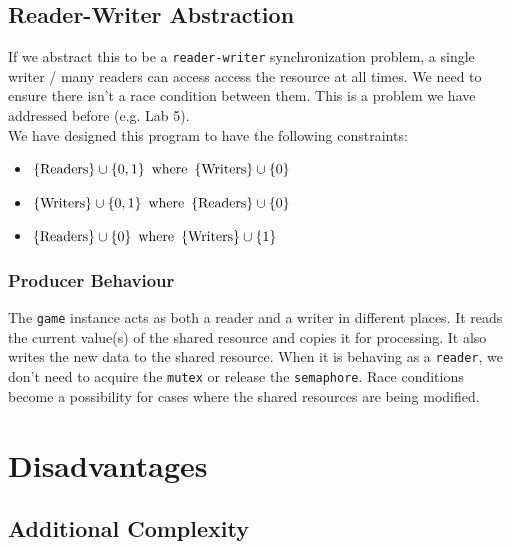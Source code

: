 \documentclass{article}
\begin{document}
\subsection{Reader-Writer Abstraction}
If we abstract this to be a \texttt{reader-writer} synchronization problem, a single writer / many readers can access access the resource at all times.
We need to ensure there isn't a race condition between them. This is a problem we have addressed before (e.g. Lab 5). \\

We have designed this program to have the following constraints:

\begin{itemize}
    \item $\{ \text{Readers} \} \cup \{ 0, 1 \} \hspace{5px} \text{where} \hspace{5px} \{ \text{Writers} \} \cup \{ 0 \}$
    \item $\{ \text{Writers} \} \cup \{ 0, 1 \} \hspace{5px} \text{where} \hspace{5px} \{ \text{Readers} \} \cup \{ 0 \}$
    \item $\{ \text{Readers} \} \cup \{ 0 \} \hspace{5px} \text{where} \hspace{5px} \{ \text{Writers} \} \cup \{ 1 \}$
\end{itemize}

\subsubsection{Producer Behaviour}

The \texttt{game} instance acts as both a reader and a writer in different places. It reads the current value(s) of the shared resource and copies it for processing. It also writes the new data to the shared resource.
When it is behaving as a \texttt{reader}, we don't need to acquire the \texttt{mutex} or release the \texttt{semaphore}. Race conditions become a possibility for cases where the shared resources are being modified.

\section{Disadvantages}


\subsection{Additional Complexity}
\end{document}

